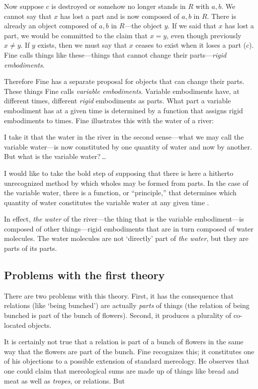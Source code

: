 \documentclass[11pt]{article}
\newenvironment{squote}{%
\begin{spacing}{1}
\begin{list}{}{%
\setlength{\labelwidth}{0pt}%
\rightmargin\leftmargin%
}
\item\relax
}{%
\end{list}%
\end{spacing}
}
\begin{document}
\begin{spacing}{1.5}
Now suppose $c$ is destroyed or somehow no longer stands in $R$ with
$a, b$.  We cannot say that $x$ has lost a part and is now composed of
$a, b$ in $R$.  There is already an object composed of $a, b$ in
$R$---the object $y$.  If we said that $x$ has lost a part, we would
be committed to the claim that $x = y$, even though previously $x \neq
y$.  If $y$ exists, then we must say that $x$ ceases to exist when it
loses a part ($c$).  Fine calls things like these---things that cannot
change their parts---{\em rigid embodiments}.

Therefore Fine has a separate proposal for objects that can change
their parts.  These things Fine calls {\em variable embodiments}.
Variable embodiments have, at different times, different {\em rigid}
embodiments as parts.  What part a variable embodiment has at a given
time is determined by a function that assigns rigid embodiments to
times.  Fine illustrates this with the water of a river:

\begin{squote}
I take it that the water in the river in the second sense---what we may
call the variable water---is now constituted by one quantity of water
and now by another. But what is the variable water?\,\ldots

I would like to take the bold step of supposing that there is here a
hitherto unrecognized method by which wholes may be formed from parts.
In the case of the variable water, there is a function, or
``principle,'' that determines which quantity of water constitutes the
variable water at any given time \citeyearpar[68]{fine1999}.
\end{squote}

In effect, {\em the water} of the river---the thing that is the
variable embodiment---is composed of other things---rigid embodiments
that are in turn composed of water molecules.  The water molecules are
not `directly' part of {\em the water}, but they are parts of its
parts.

\subsection{Problems with the first theory}
\label{problems1}
There are two problems with this theory.  First, it has the
consequence that relations (like `being bunched') are actually {\em
  parts} of things (the relation of being bunched is part of the bunch
of flowers).  Second, it produces a plurality of co-located objects.

It is certainly not true that a relation is part of a bunch of flowers
in the same way that the flowers are part of the bunch.  Fine
recognizes this; it constitutes one of his objections to a possible
extension of standard mereology.  He observes that one could claim
that mereological sums are made up of things like bread and meat as
well as {\em tropes}, or relations.  But


\end{spacing}
\end{document}
